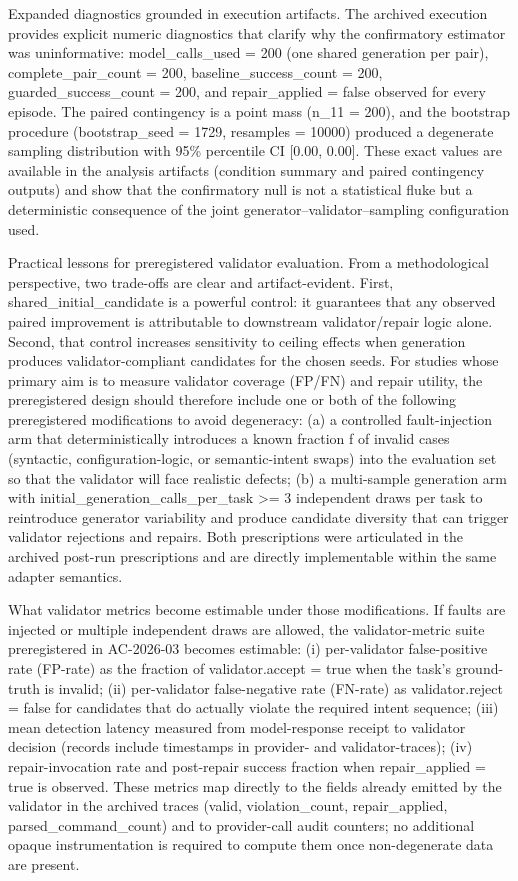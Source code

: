 \documentclass[conference]{IEEEtran}
\begin{document}
Expanded diagnostics grounded in execution artifacts. The archived execution provides explicit numeric diagnostics that clarify why the confirmatory estimator was uninformative: model\_calls\_used = 200 (one shared generation per pair), complete\_pair\_count = 200, baseline\_success\_count = 200, guarded\_success\_count = 200, and repair\_applied = false observed for every episode. The paired contingency is a point mass (n\_11 = 200), and the bootstrap procedure (bootstrap\_seed = 1729, resamples = 10000) produced a degenerate sampling distribution with 95\% percentile CI [0.00, 0.00]. These exact values are available in the analysis artifacts (condition summary and paired contingency outputs) and show that the confirmatory null is not a statistical fluke but a deterministic consequence of the joint generator--validator--sampling configuration used.

Practical lessons for preregistered validator evaluation. From a methodological perspective, two trade-offs are clear and artifact-evident. First, shared\_initial\_candidate is a powerful control: it guarantees that any observed paired improvement is attributable to downstream validator/repair logic alone. Second, that control increases sensitivity to ceiling effects when generation produces validator-compliant candidates for the chosen seeds. For studies whose primary aim is to measure validator coverage (FP/FN) and repair utility, the preregistered design should therefore include one or both of the following preregistered modifications to avoid degeneracy: (a) a controlled fault-injection arm that deterministically introduces a known fraction f of invalid cases (syntactic, configuration-logic, or semantic-intent swaps) into the evaluation set so that the validator will face realistic defects; (b) a multi-sample generation arm with initial\_generation\_calls\_per\_task >= 3 independent draws per task to reintroduce generator variability and produce candidate diversity that can trigger validator rejections and repairs. Both prescriptions were articulated in the archived post-run prescriptions and are directly implementable within the same adapter semantics.

What validator metrics become estimable under those modifications. If faults are injected or multiple independent draws are allowed, the validator-metric suite preregistered in AC-2026-03 becomes estimable: (i) per-validator false-positive rate (FP-rate) as the fraction of validator.accept = true when the task's ground-truth is invalid; (ii) per-validator false-negative rate (FN-rate) as validator.reject = false for candidates that do actually violate the required intent sequence; (iii) mean detection latency measured from model-response receipt to validator decision (records include timestamps in provider- and validator-traces); (iv) repair-invocation rate and post-repair success fraction when repair\_applied = true is observed. These metrics map directly to the fields already emitted by the validator in the archived traces (valid, violation\_count, repair\_applied, parsed\_command\_count) and to provider-call audit counters; no additional opaque instrumentation is required to compute them once non-degenerate data are present.
\end{document}
